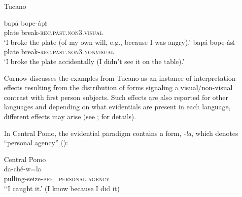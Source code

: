 \documentclass[output=paper]{langsci/langscibook}
\begin{document}
\begin{exe}
\ex Tucano\label{ex:hb2}
	\begin{xlist}
	\ex \label{ex:hb2a}
	\gll bapá bope-ápɨ\\
	plate break-\textsc{rec}.\textsc{past}.\textsc{non}3.\textsc{visual}\\
	\trans ‘I broke the plate (of my own will, e.g., because I was angry).’ 
	\ex \label{ex:hb2b}
	\gll bapá bope-ásɨ \\
	plate break-\textsc{rec}.\textsc{past}.\textsc{non}3.\textsc{nonvisual}\\
	\trans ‘I broke the plate accidentally (I didn't see it on the table).’ 	
	\end{xlist}
\end{exe}

Curnow discusses the examples from Tucano as an instance of interpretation effects resulting from the distribution of forms signaling a visual/non-visual contrast with first person subjects. Such effects are also reported for other languages and depending on what evidentials are present in each language, different effects may arise (see \citealt{Curnow2002b}; \citealt{Curnow2003} for details).

In Central Pomo, the evidential paradigm contains a form, -\textit{la}, which denotes “personal agency” (\citealt[181]{Mithun1999}):

\begin{exe}
\ex Central Pomo\label{ex:hb3}\\
	\gll da-ché-w=la\\
	pulling-seize-\textsc{prf}=\textsc{personal}.\textsc{agency}\\
	\trans ‘‘I caught it.’ (I know because I did it) 
\end{exe}
\end{document}
